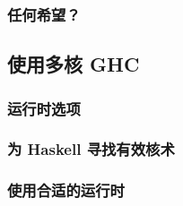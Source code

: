 \documentclass[./main.tex]{subfiles}
\begin{document}
%

\begin{lstlisting}[language=Haskell]

\end{lstlisting}



\begin{lstlisting}[language=Haskell]

\end{lstlisting}



\begin{lstlisting}[language=Haskell]

\end{lstlisting}



\begin{lstlisting}[language=Haskell]

\end{lstlisting}

\subsubsection*{任何希望？}

\subsection*{使用多核 GHC}

\subsubsection*{运行时选项}

\subsubsection*{为 Haskell 寻找有效核术}

\subsubsection*{使用合适的运行时}
\end{document}
